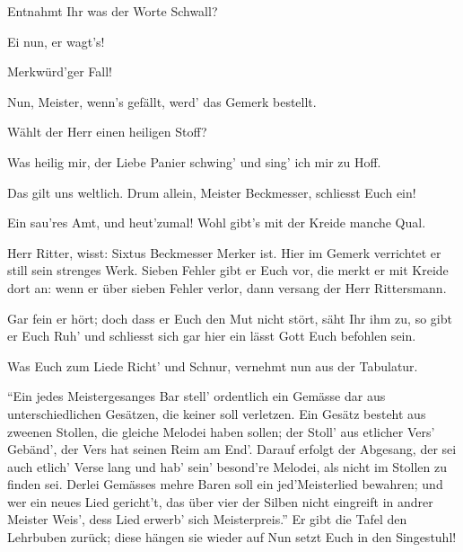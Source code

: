 \begin{drama}
\Beckmesserspeaks
Entnahmt Ihr was der Worte Schwall?

\Vogelgesangspeaks
Ei nun, er wagt's!

\Nachtigallspeaks

Merkwürd'ger Fall!

\Kothnerspeaks
Nun, Meister, wenn's gefällt,
werd' das Gemerk bestellt.


Wählt der Herr einen heiligen Stoff?

\Waltherspeaks
Was heilig mir, der Liebe Panier
schwing' und sing' ich mir zu Hoff.

\Kothnerspeaks
Das gilt uns weltlich. Drum allein,
Meister Beckmesser, schliesst Euch ein!

\Beckmesserspeaks


Ein sau'res Amt, und heut'zumal!
Wohl gibt's mit der Kreide manche Qual.


Herr Ritter, wisst:
Sixtus Beckmesser Merker ist.
Hier im Gemerk
verrichtet er still sein strenges Werk.
Sieben Fehler gibt er Euch vor,
die merkt er mit Kreide dort an:
wenn er über sieben Fehler verlor,
dann versang der Herr Rittersmann.


Gar fein er hört;
doch dass er Euch den Mut nicht stört,
säht Ihr ihm zu, so gibt er Euch Ruh'
und schliesst sich gar hier ein
lässt Gott Euch befohlen sein.



\Kothnerspeaks
{}

Was Euch zum Liede Richt' und Schnur,
vernehmt nun aus der Tabulatur.


``Ein jedes Meistergesanges Bar
stell' ordentlich ein Gemässe dar
aus unterschiedlichen Gesätzen,
die keiner soll verletzen.
Ein Gesätz besteht aus zweenen Stollen,
die gleiche Melodei haben sollen;
der Stoll' aus etlicher Vers' Gebänd',
der Vers hat seinen Reim am End'.
Darauf erfolgt der Abgesang,
der sei auch etlich' Verse lang
und hab' sein' besond're Melodei,
als nicht im Stollen zu finden sei.
Derlei Gemässes mehre Baren
soll ein jed'Meisterlied bewahren;
und wer ein neues Lied gericht't,
das über vier der Silben nicht
eingreift in andrer Meister Weis',
dess Lied erwerb' sich Meisterpreis.''
Er gibt die Tafel den Lehrbuben zurück; diese hängen sie wieder auf
Nun setzt Euch in den Singestuhl!


\end{drama}
